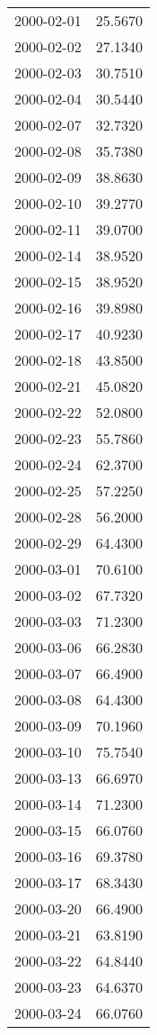\begin{tabular}{lr}
2000-02-01 &     25.5670 \\
2000-02-02 &     27.1340 \\
2000-02-03 &     30.7510 \\
2000-02-04 &     30.5440 \\
2000-02-07 &     32.7320 \\
2000-02-08 &     35.7380 \\
2000-02-09 &     38.8630 \\
2000-02-10 &     39.2770 \\
2000-02-11 &     39.0700 \\
2000-02-14 &     38.9520 \\
2000-02-15 &     38.9520 \\
2000-02-16 &     39.8980 \\
2000-02-17 &     40.9230 \\
2000-02-18 &     43.8500 \\
2000-02-21 &     45.0820 \\
2000-02-22 &     52.0800 \\
2000-02-23 &     55.7860 \\
2000-02-24 &     62.3700 \\
2000-02-25 &     57.2250 \\
2000-02-28 &     56.2000 \\
2000-02-29 &     64.4300 \\
2000-03-01 &     70.6100 \\
2000-03-02 &     67.7320 \\
2000-03-03 &     71.2300 \\
2000-03-06 &     66.2830 \\
2000-03-07 &     66.4900 \\
2000-03-08 &     64.4300 \\
2000-03-09 &     70.1960 \\
2000-03-10 &     75.7540 \\
2000-03-13 &     66.6970 \\
2000-03-14 &     71.2300 \\
2000-03-15 &     66.0760 \\
2000-03-16 &     69.3780 \\
2000-03-17 &     68.3430 \\
2000-03-20 &     66.4900 \\
2000-03-21 &     63.8190 \\
2000-03-22 &     64.8440 \\
2000-03-23 &     64.6370 \\
2000-03-24 &     66.0760 \\

\end{tabular}

